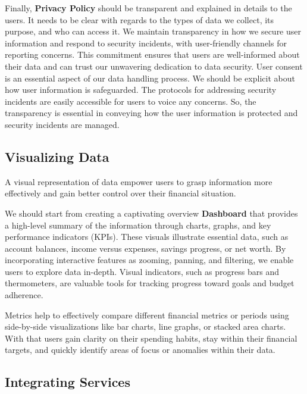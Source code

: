Finally, \textbf{Privacy Policy} should be transparent and explained in details to the users. It needs to be clear with
regards to the types of data we collect, its purpose, and who can access it. We maintain transparency in how we secure 
user information and respond to security incidents, with user-friendly channels for reporting concerns. This commitment 
ensures that users are well-informed about their data and can trust our unwavering dedication to data security. User 
consent is an essential aspect of our data handling process. We should be explicit about how user information is 
safeguarded. The protocols for addressing security incidents are easily accessible for users to voice any concerns. So, 
the transparency is essential in conveying how the user information is protected and security incidents are managed.


\subsection{Visualizing Data}

A visual representation of data empower users to grasp information more effectively and gain better control over their 
financial situation.

We should start from creating a captivating overview \textbf{Dashboard} that provides a high-level summary of the 
information through charts, graphs, and key performance indicators (KPIs). These visuals illustrate essential data, 
such as account balances, income versus expenses, savings progress, or net worth.  By incorporating interactive features 
as zooming, panning, and filtering, we enable users to explore data in-depth. Visual indicators, such as progress bars 
and thermometers, are valuable tools for tracking progress toward goals and budget adherence. 

Metrics help to effectively compare different financial metrics or periods using side-by-side visualizations like bar 
charts, line graphs, or stacked area charts. With that users gain clarity on their spending habits, stay within 
their financial targets, and quickly identify areas of focus or anomalies within their data.


\subsection{Integrating Services}

